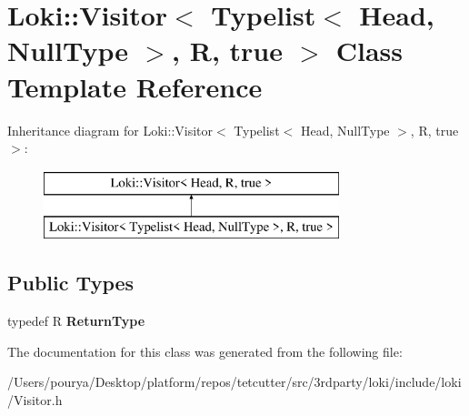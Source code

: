 \hypertarget{classLoki_1_1Visitor_3_01Typelist_3_01Head_00_01NullType_01_4_00_01R_00_01true_01_4}{}\section{Loki\+:\+:Visitor$<$ Typelist$<$ Head, Null\+Type $>$, R, true $>$ Class Template Reference}
\label{classLoki_1_1Visitor_3_01Typelist_3_01Head_00_01NullType_01_4_00_01R_00_01true_01_4}
Inheritance diagram for Loki\+:\+:Visitor$<$ Typelist$<$ Head, Null\+Type $>$, R, true $>$\+:\begin{figure}[H]
\begin{center}
\leavevmode
\includegraphics[height=2.000000cm]{classLoki_1_1Visitor_3_01Typelist_3_01Head_00_01NullType_01_4_00_01R_00_01true_01_4}
\end{center}
\end{figure}
\subsection*{Public Types}
\begin{DoxyCompactItemize}
\item 
\hypertarget{classLoki_1_1Visitor_3_01Typelist_3_01Head_00_01NullType_01_4_00_01R_00_01true_01_4_aee12edb9eb396220c6197c4bd2e55997}{}typedef R {\bfseries Return\+Type}\label{classLoki_1_1Visitor_3_01Typelist_3_01Head_00_01NullType_01_4_00_01R_00_01true_01_4_aee12edb9eb396220c6197c4bd2e55997}

\end{DoxyCompactItemize}


The documentation for this class was generated from the following file\+:\begin{DoxyCompactItemize}
\item 
/\+Users/pourya/\+Desktop/platform/repos/tetcutter/src/3rdparty/loki/include/loki/Visitor.\+h\end{DoxyCompactItemize}
